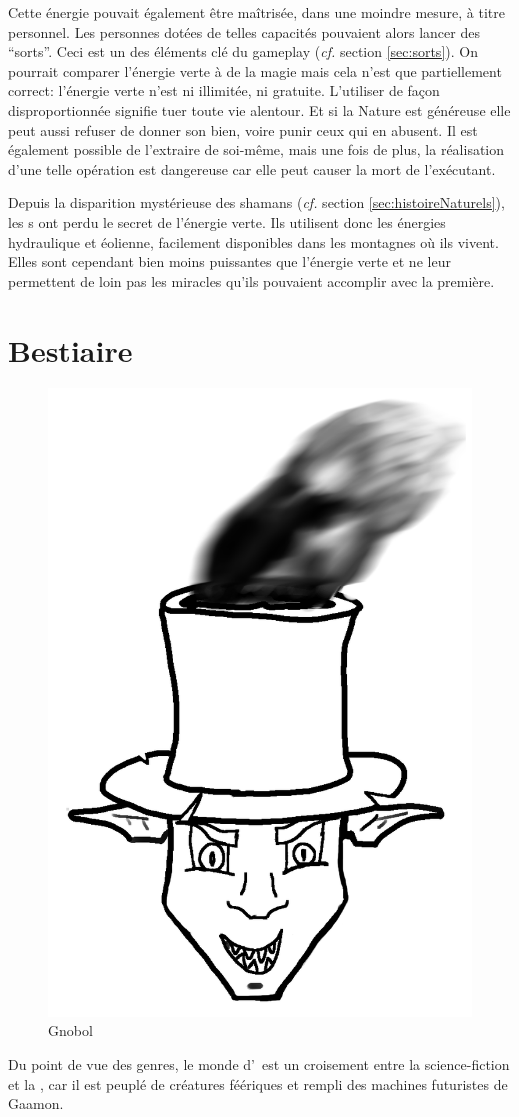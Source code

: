 Cette énergie pouvait également être maîtrisée, dans une moindre mesure, à titre personnel. Les personnes dotées de telles capacités pouvaient alors lancer des \enquote{sorts}. Ceci est un des éléments clé du gameplay (\textit{cf.} section \ref{sec:sorts}). On pourrait comparer l'énergie verte à de la magie mais cela n'est que partiellement correct: l'énergie verte n'est ni illimitée, ni gratuite. L'utiliser de façon disproportionnée signifie tuer toute vie alentour. Et si la Nature est généreuse elle peut aussi refuser de donner son bien, voire punir ceux qui en abusent. Il est également possible de l'extraire de soi-même, mais une fois de plus, la réalisation d'une telle opération est dangereuse car elle peut causer la mort de l'exécutant.

Depuis la disparition mystérieuse des shamans (\textit{cf.} section \ref{sec:histoireNaturels}), les \nomNaturels s ont perdu le secret de l'énergie verte. Ils utilisent donc les énergies hydraulique et éolienne, facilement disponibles dans les montagnes où ils vivent. Elles sont cependant bien moins puissantes que l'énergie verte et ne leur permettent de loin pas les miracles qu'ils pouvaient accomplir avec la première.



\section{Bestiaire}
\label{sec:Bestiaire}

\begin{figure}
	\vspace*{-.8cm}
	\center
	\includegraphics[width=.3\textwidth]{images/Monde/Gnobol.png}
	\caption{\label{fig:Gnobol}Gnobol}
\end{figure}
Du point de vue des genres, le monde d'\nomUnivers\ est un croisement entre la science-fiction et la , car il est peuplé de créatures féériques et rempli des machines futuristes de Gaamon.

